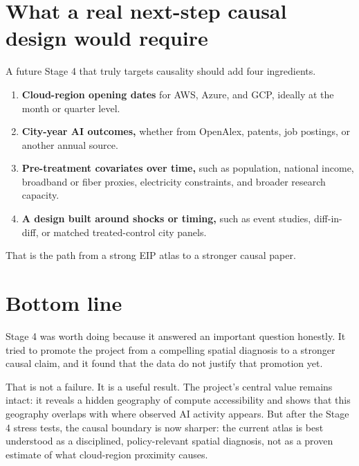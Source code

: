 \documentclass[11pt]{article}
\begin{document}
\section{What a real next-step causal design would require}
A future Stage 4 that truly targets causality should add four ingredients.
\begin{enumerate}[leftmargin=*]
    \item \textbf{Cloud-region opening dates} for AWS, Azure, and GCP, ideally at the month or quarter level.
    \item \textbf{City-year AI outcomes,} whether from OpenAlex, patents, job postings, or another annual source.
    \item \textbf{Pre-treatment covariates over time,} such as population, national income, broadband or fiber proxies, electricity constraints, and broader research capacity.
    \item \textbf{A design built around shocks or timing,} such as event studies, diff-in-diff, or matched treated-control city panels.
\end{enumerate}

That is the path from a strong EIP atlas to a stronger causal paper.

\section{Bottom line}
Stage 4 was worth doing because it answered an important question honestly. It tried to promote the project from a compelling spatial diagnosis to a stronger causal claim, and it found that the data do not justify that promotion yet.

That is not a failure. It is a useful result. The project's central value remains intact: it reveals a hidden geography of compute accessibility and shows that this geography overlaps with where observed AI activity appears. But after the Stage 4 stress tests, the causal boundary is now sharper: the current atlas is best understood as a disciplined, policy-relevant spatial diagnosis, not as a proven estimate of what cloud-region proximity causes.
\end{document}
